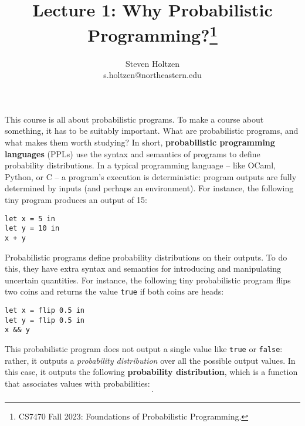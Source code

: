 \documentclass{tufte-handout}
\title{Lecture 1: Why Probabilistic Programming?\thanks{CS7470 Fall 2023: Foundations of Probabilistic Programming.}}
\author[]{Steven Holtzen \\ s.holtzen@northeastern.edu}
\newcommand{\defn}[1]{\textbf{#1}}
\begin{document}
\maketitle%

This course is all about probabilistic programs. To make a course about
something, it has to be suitably important. What are probabilistic programs, and
what makes them worth studying?  In short, \defn{probabilistic
programming languages} (PPLs) use the syntax and semantics of programs to define probability
distributions.
In a typical programming language -- like OCaml, Python, or C -- 
a program's execution is deterministic: program outputs are fully determined by inputs 
(and perhaps an environment). For instance, the following tiny program 
produces an output of 15:

\begin{lstlisting}
let x = 5 in
let y = 10 in
x + y
\end{lstlisting}

Probabilistic programs define probability distributions on their outputs. 
To do this, they have extra syntax and semantics for introducing and manipulating 
uncertain quantities. For instance, the following tiny probabilistic program flips 
two coins and returns the value \texttt{true} if both coins are heads:

\begin{lstlisting}
let x = flip 0.5 in
let y = flip 0.5 in
x && y
\end{lstlisting}

This probabilistic program does not output a single value like \texttt{true} or
\texttt{false}: rather, it outputs a \emph{probability distribution} over all
the possible output values. In this case, it outputs the following \defn{probability 
distribution}, which is a function that associates values with probabilities:
\begin{align*}
  [\texttt{true} \mapsto 0.25, \qquad \texttt{false} \mapsto 0.75].
\end{align*}
\end{document}
